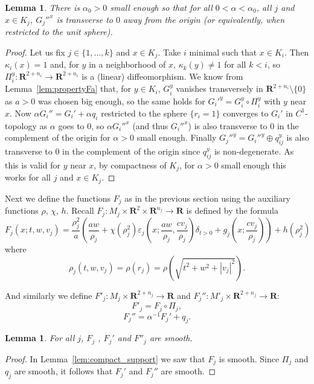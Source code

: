 \documentclass[reqno]{amsart}
\newcommand{\THOMAS}[1]%
	{\begin{quotation}{\footnotesize\textcolor{brown}{\textbf{Thomas:} #1}}\end{quotation}}
\renewcommand{\epsilon}{\varepsilon}
\theoremstyle{theorem}
\newtheorem{lemma}[corollary]{Lemma}
\theoremstyle{remark}
\theoremstyle{definition}
\newcommand{\R}{\mathbf{R}}
\begin{document}
\begin{lemma}
There is $\alpha_0>0$ small enough so that for all $0<\alpha<\alpha_0$, all $j$ and $x\in K_j$, $G_j''^x$ is transverse to $0$ away from the origin (or equivalently, when restricted to 
the unit sphere).
\end{lemma}
\begin{proof}
Let us fix $j\in\{1,\dots,k\}$ and $x\in K_j$. Take $i$ minimal such that $x\in K_i$.
Then $\kappa_i(x)=1$ and, for $y$ in a neighborhood of $x$, $\kappa_k(y)\neq 1$ for all $k<i$, so $\Pi_i^y : \R^{2+n_i}\to \R^{2+n_i}$ is a (linear) diffeomorphism.
We know from Lemma~\ref{lem:propertyFa} that, for $y\in K_i$, $G^y_i$ vanishes transversely in $\R^{2+n_i}\setminus \{0\}$ as $a>0$ was chosen big enough, so
the same holds for $G_i'^{y}=G_i^y\circ \Pi_i^y$ with $y$ near $x$. Now $\alpha G_i''=G_i'+\alpha q_i$ restricted to the sphere $\{r_i=1\}$ converges to $G_i'$ in $C^1$-topology
as $\alpha$ goes to $0$, so $\alpha G_i''^{x}$ (and thus $G_i''^{x}$) is also transverse to $0$ in the complement of the origin for $\alpha >0$ small enough. Finally $G_j''^{y}=G_i''^{y}\oplus q^y_{ij}$
is also transverse to $0$ in the complement of the origin since $q_{ij}^y$ is non-degenerate.
As this is valid for $y$ near $x$, by compactness of $K_j$, for $\alpha >0$ small enough
this works for all $j$ and $x\in K_j$.
\end{proof}






Next we define the functions $F_j$ as in the previous section using the auxiliary functions $\rho$, $\chi$, $h$.
Recall $F_j:M_j \times \R^2 \times \R^{n_j} \to \R$ is defined by the formula
\[F_j(x;t,w,v_j)=\frac{\rho_j^2}{a}\left(\frac{aw}{\rho_j} + \chi(\rho_j^2)\epsilon_j\left(x;\frac{aw}{\rho_j},\frac{cv_j}{\rho_j}\right)\delta_{t>0}
+g_j\left(x;\frac{cv_j}{\rho_j}\right)\right)+ h(\rho_j^2)\]
where 
\[\rho_j(t,w,v_j)=\rho(r_j)=\rho\left(\sqrt{t^2+w^2+|v_j|^2}\right).\]


And similarly we define $F'_j:M_j\times \R^{2+n_j}\to \R$ and $F_j'':M'_j\times \R^{2+n_j}\to \R$:
\[F'_j=F_j\circ \Pi_j,\]
\[F_j''=\alpha^{-1}F_j'+q_j.\]
\begin{lemma}
For all $j$, $F_j$ , $F_j'$ and $F''_j$ are smooth.
\end{lemma}
\begin{proof}
  In Lemma~\ref{lem:compact_support} we saw that $F_j$ is smooth. Since $\Pi_j$ and $q_j$ are smooth, it follows that $F_j'$ and $F_j''$ are smooth.
\end{proof}
\end{document}
